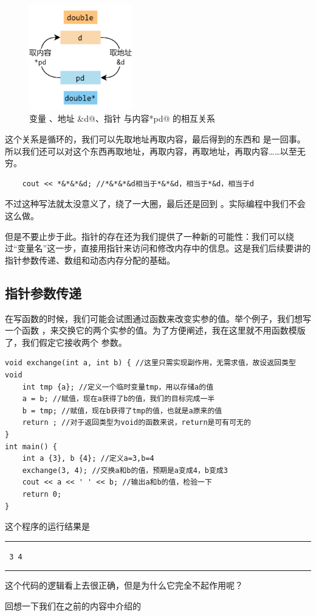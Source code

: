 \begin{figure}[htbp]
    \centering
    \includegraphics[width=0.4\textwidth]{../images/generalized_parts/05_relationship_between_variables_and_pointers_300.png}
    \caption{变量 \lstinline@d@、地址 \lstinline@&d@、指针 \lstinline@pd@ 与内容\lstinline@*pd@ 的相互关系}
\end{figure}
这个关系是循环的，我们可以先取地址再取内容，最后得到的东西和 \lstinline@d@ 是一回事。所以我们还可以对这个东西再取地址，再取内容，再取地址，再取内容……以至无穷。
\begin{lstlisting}
    cout << *&*&*&d; //*&*&*&d相当于*&*&d，相当于*&d，相当于d
\end{lstlisting}
不过这种写法就太没意义了，绕了一大圈，最后还是回到 \lstinline@d@。实际编程中我们不会这么做。\par
但是不要止步于此。指针的存在还为我们提供了一种新的可能性：我们可以绕过``变量名''这一步，直接用指针来访问和修改内存中的信息。这是我们后续要讲的指针参数传递、数组和动态内存分配的基础。\par
\subsection*{指针参数传递}
在写函数的时候，我们可能会试图通过函数来改变实参的值。举个例子，我们想写一个函数 \lstinline@exchange@，来交换它的两个实参的值。为了方便阐述，我在这里就不用函数模版了，我们假定它接收两个 \lstinline@int@ 参数。
\begin{lstlisting}
void exchange(int a, int b) { //这里只需实现副作用，无需求值，故设返回类型void
    int tmp {a}; //定义一个临时变量tmp，用以存储a的值
    a = b; //赋值，现在a获得了b的值，我们的目标完成一半
    b = tmp; //赋值，现在b获得了tmp的值，也就是a原来的值
    return ; //对于返回类型为void的函数来说，return是可有可无的
}
int main() {
    int a {3}, b {4}; //定义a=3,b=4
    exchange(3, 4); //交换a和b的值，预期是a变成4，b变成3
    cout << a << ' ' << b; //输出a和b的值，检验一下
    return 0;
}
\end{lstlisting}
这个程序的运行结果是\\\noindent\rule{\linewidth}{0.2pt}\texttt{
3 4
}\\\noindent\rule{\linewidth}{0.2pt}
这个代码的逻辑看上去很正确，但是为什么它完全不起作用呢？\par
回想一下我们在之前的内容中介绍的
